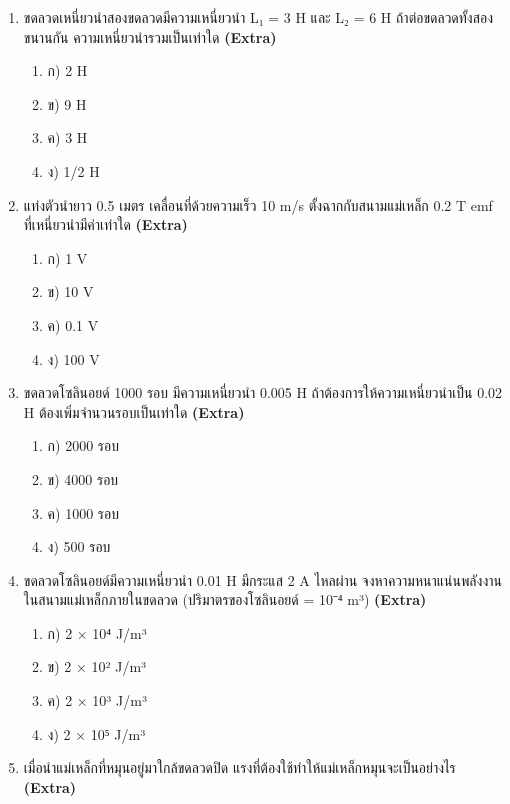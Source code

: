 \documentclass[12pt]{article}
\begin{document}
\begin{enumerate}[label=\arabic*.]
\begin{enumerate}[label=)]
\item ก) ℰ = Bvl
\item ข) ℰ = Bv/l
\item ค) ℰ = Bv²l
\item ง) ℰ = Bl/v
\end{enumerate}
\item ขดลวดเหนี่ยวนำสองขดลวดมีความเหนี่ยวนำ L₁ = 3 H และ L₂ = 6 H ถ้าต่อขดลวดทั้งสองขนานกัน ความเหนี่ยวนำรวมเป็นเท่าใด \hfill \textbf{\small (Extra)}
\begin{enumerate}[label=)]
\item ก) 2 H
\item ข) 9 H
\item ค) 3 H
\item ง) 1/2 H
\end{enumerate}
\item แท่งตัวนำยาว 0.5 เมตร เคลื่อนที่ด้วยความเร็ว 10 m/s ตั้งฉากกับสนามแม่เหล็ก 0.2 T emf ที่เหนี่ยวนำมีค่าเท่าใด \hfill \textbf{\small (Extra)}
\begin{enumerate}[label=)]
\item ก) 1 V
\item ข) 10 V
\item ค) 0.1 V
\item ง) 100 V
\end{enumerate}
\item ขดลวดโซลินอยด์ 1000 รอบ มีความเหนี่ยวนำ 0.005 H ถ้าต้องการให้ความเหนี่ยวนำเป็น 0.02 H ต้องเพิ่มจำนวนรอบเป็นเท่าใด \hfill \textbf{\small (Extra)}
\begin{enumerate}[label=)]
\item ก) 2000 รอบ
\item ข) 4000 รอบ
\item ค) 1000 รอบ
\item ง) 500 รอบ
\end{enumerate}
\item ขดลวดโซลินอยด์มีความเหนี่ยวนำ 0.01 H มีกระแส 2 A ไหลผ่าน จงหาความหนาแน่นพลังงานในสนามแม่เหล็กภายในขดลวด (ปริมาตรของโซลินอยด์ = 10⁻⁴ m³) \hfill \textbf{\small (Extra)}
\begin{enumerate}[label=)]
\item ก) 2 × 10⁴ J/m³
\item ข) 2 × 10² J/m³
\item ค) 2 × 10³ J/m³
\item ง) 2 × 10⁵ J/m³
\end{enumerate}
\item เมื่อนำแม่เหล็กที่หมุนอยู่มาใกล้ขดลวดปิด แรงที่ต้องใช้ทำให้แม่เหล็กหมุนจะเป็นอย่างไร \hfill \textbf{\small (Extra)}

\end{enumerate}
\end{document}
